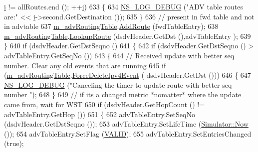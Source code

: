 \begin{DoxyCode}
      \hyperlink{bernuolliDistribution_8m_a6f6ccfcf58b31cb6412107d9d5281426}{i} != allRoutes.end (); ++\hyperlink{bernuolliDistribution_8m_a6f6ccfcf58b31cb6412107d9d5281426}{i})
633                 \{
634                   \hyperlink{group__logging_ga413f1886406d49f59a6a0a89b77b4d0a}{NS\_LOG\_DEBUG} (\textcolor{stringliteral}{"ADV table routes are:"} << \hyperlink{bernuolliDistribution_8m_a6f6ccfcf58b31cb6412107d9d5281426}{i}->second.GetDestination ());
635                 \}
636               \textcolor{comment}{// present in fwd table and not in advtable}
637               \hyperlink{classns3_1_1dsdv_1_1RoutingProtocol_adce3cf63777d6099e58caa1cb198282c}{m\_advRoutingTable}.\hyperlink{classns3_1_1dsdv_1_1RoutingTable_a4eed9bac83e90f1db01e414892e10b9b}{AddRoute} (fwdTableEntry);
638               \hyperlink{classns3_1_1dsdv_1_1RoutingProtocol_adce3cf63777d6099e58caa1cb198282c}{m\_advRoutingTable}.\hyperlink{classns3_1_1dsdv_1_1RoutingTable_a0bfb9dc677f02bd740973865e38df763}{LookupRoute} (dsdvHeader.GetDst (),advTableEntry
      );
639             \}
640           \textcolor{keywordflow}{if} (dsdvHeader.GetDstSeqno () %
641             \{
642               \textcolor{keywordflow}{if} (dsdvHeader.GetDstSeqno () > advTableEntry.GetSeqNo ())
643                 \{
644                   \textcolor{comment}{// Received update with better seq number. Clear any old events that are running}
645                   \textcolor{keywordflow}{if} (\hyperlink{classns3_1_1dsdv_1_1RoutingProtocol_adce3cf63777d6099e58caa1cb198282c}{m\_advRoutingTable}.\hyperlink{classns3_1_1dsdv_1_1RoutingTable_a39f4b7725caafbc6cd9f7c5821470d51}{ForceDeleteIpv4Event} (
      dsdvHeader.GetDst ()))
646                     \{
647                       \hyperlink{group__logging_ga413f1886406d49f59a6a0a89b77b4d0a}{NS\_LOG\_DEBUG} (\textcolor{stringliteral}{"Canceling the timer to update route with better seq number
      "});
648                     \}
649                   \textcolor{comment}{// if its a changed metric *nomatter* where the update came from, wait  for WST}
650                   \textcolor{keywordflow}{if} (dsdvHeader.GetHopCount () != advTableEntry.GetHop ())
651                     \{
652                       advTableEntry.SetSeqNo (dsdvHeader.GetDstSeqno ());
653                       advTableEntry.SetLifeTime (\hyperlink{classns3_1_1Simulator_ac3178fa975b419f7875e7105be122800}{Simulator::Now} ());
654                       advTableEntry.SetFlag (\hyperlink{namespacens3_1_1dsdv_aa1c39555b993cc6f56f2c8c6c31e2c3baf2cbf3d202d1c7338230c662e6822e65}{VALID});
655                       advTableEntry.SetEntriesChanged (\textcolor{keyword}{true});

\end{DoxyCode}
